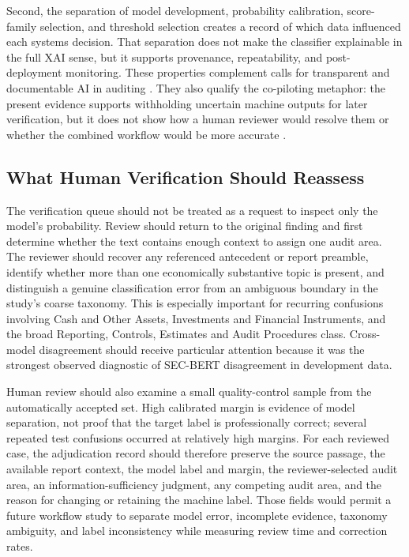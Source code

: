 \documentclass[11pt]{article}
\begin{document}
Second, the separation of model development, probability calibration,
score-family selection, and threshold selection creates a record of which data
influenced each systems decision. That separation does not make the classifier
explainable in the full XAI sense, but it supports provenance, repeatability, and
post-deployment monitoring. These properties complement calls for transparent and
documentable AI in auditing \cite{zhang2022xai}. They also qualify the
co-piloting metaphor: the present evidence supports withholding uncertain machine
outputs for later verification, but it does not show how a human reviewer would
resolve them or whether the combined workflow would be more accurate
\cite{gu2024copiloted}.

\subsection{What Human Verification Should Reassess}

The verification queue should not be treated as a request to inspect only the
model's probability. Review should return to the original finding and first
determine whether the text contains enough context to assign one audit area. The
reviewer should recover any referenced antecedent or report preamble, identify
whether more than one economically substantive topic is present, and distinguish
a genuine classification error from an ambiguous boundary in the study's coarse
taxonomy. This is especially important for recurring confusions involving Cash
and Other Assets, Investments and Financial Instruments, and the broad Reporting,
Controls, Estimates and Audit Procedures class. Cross-model disagreement should
receive particular attention because it was the strongest observed diagnostic of
SEC-BERT disagreement in development data.

Human review should also examine a small quality-control sample from the
automatically accepted set. High calibrated margin is evidence of model
separation, not proof that the target label is professionally correct; several
repeated test confusions occurred at relatively high margins. For each reviewed
case, the adjudication record should therefore preserve the source passage, the
available report context, the model label and margin, the reviewer-selected audit
area, an information-sufficiency judgment, any competing audit area, and the
reason for changing or retaining the machine label. Those fields would permit a
future workflow study to separate model error, incomplete evidence, taxonomy
ambiguity, and label inconsistency while measuring review time and correction
rates.
\end{document}

